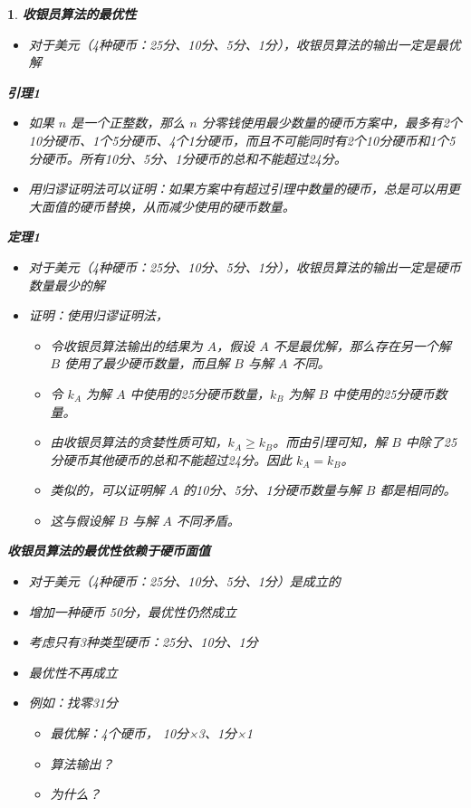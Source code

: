 \documentclass[UTF8]{report}
\theoremstyle{MyLineTheoremStyle} %
\theoremstyle{MyBlockTheoremStyle} %
\theoremstyle{MySubsubsectionStyle} %
\newtheorem{definition}{}
\begin{document}
\begin{definition}
    \textbf{收银员算法的最优性}\par
    \begin{itemize}
        \item 对于美元（4种硬币：25分、10分、5分、1分），收银员算法的输出一定是最优解
    \end{itemize}

    \textbf{引理1}\par
    \begin{itemize}
        \item 如果 $n$ 是一个正整数，那么 $n$ 分零钱使用最少数量的硬币方案中，最多有2个10分硬币、1个5分硬币、4个1分硬币，而且不可能同时有2个10分硬币和1个5分硬币。所有10分、5分、1分硬币的总和不能超过24分。
        \item 用归谬证明法可以证明：如果方案中有超过引理中数量的硬币，总是可以用更大面值的硬币替换，从而减少使用的硬币数量。
    \end{itemize}

    \textbf{定理1}\par
    \begin{itemize}
        \item 对于美元（4种硬币：25分、10分、5分、1分），收银员算法的输出一定是硬币数量最少的解
        \item 证明：使用归谬证明法，
        \begin{itemize}
            \item 令收银员算法输出的结果为 $A$，假设 $A$ 不是最优解，那么存在另一个解 $B$ 使用了最少硬币数量，而且解 $B$ 与解 $A$ 不同。
            \item 令 $k_A$ 为解 $A$ 中使用的25分硬币数量，$k_B$ 为解 $B$ 中使用的25分硬币数量。
            \item 由收银员算法的贪婪性质可知，$k_A \geq k_B$。而由引理可知，解 $B$ 中除了25分硬币其他硬币的总和不能超过24分。因此 $k_A = k_B$。
            \item 类似的，可以证明解 $A$ 的10分、5分、1分硬币数量与解 $B$ 都是相同的。
            \item 这与假设解 $B$ 与解 $A$ 不同矛盾。
        \end{itemize}
    \end{itemize}

    \textbf{收银员算法的最优性依赖于硬币面值}\par
    \begin{itemize}
        \item 对于美元（4种硬币：25分、10分、5分、1分）是成立的
        \item 增加一种硬币 50分，最优性仍然成立
        \item 考虑只有3种类型硬币：25分、10分、1分
        \item 最优性不再成立
        \item 例如：找零31分
        \begin{itemize}
            \item 最优解：4个硬币， 10分×3、1分×1
            \item 算法输出？
            \item 为什么？
        \end{itemize}
    \end{itemize}


\end{definition}
\end{document}
